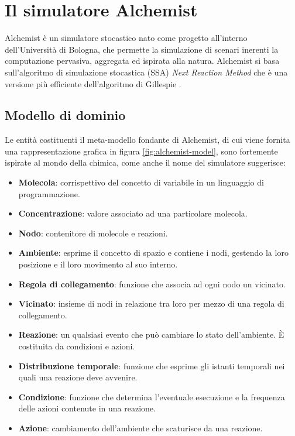 \section{Il simulatore Alchemist}
Alchemist \cite{Pianini2013} è un simulatore stocastico nato come progetto all'interno dell'Università di Bologna, che permette la simulazione di scenari inerenti la computazione pervasiva, aggregata ed ispirata alla natura.
\newline
Alchemist si basa sull'algoritmo di simulazione stocastica (SSA) \textit{Next Reaction Method} \cite{Gibson2000} che è una versione più efficiente dell'algoritmo di Gillespie \cite{Gillespie1977}.

\subsection{Modello di dominio}
Le entità costituenti il meta-modello fondante di Alchemist, di cui viene fornita una rappresentazione grafica in figura \ref{fig:alchemist-model}, sono fortemente ispirate al mondo della chimica, come anche il nome del simulatore suggerisce:
\begin{itemize}
 \item \textbf{Molecola}: corrispettivo del concetto di variabile in un linguaggio di programmazione.
 \item \textbf{Concentrazione}: valore associato ad una particolare molecola.
 \item \textbf{Nodo}: contenitore di molecole e reazioni.
 \item \textbf{Ambiente}: esprime il concetto di spazio e contiene i nodi, gestendo la loro posizione e il loro movimento al suo interno.
 \item \textbf{Regola di collegamento}: funzione che associa ad ogni nodo un vicinato.
 \item \textbf{Vicinato}: insieme di nodi in relazione tra loro per mezzo di una regola di collegamento.
 \item \textbf{Reazione}: un qualsiasi evento che può cambiare lo stato dell'ambiente. È costituita da condizioni e azioni.
 \item \textbf{Distribuzione temporale}: funzione che esprime gli istanti temporali nei quali una reazione deve avvenire.
 \item \textbf{Condizione}: funzione che determina l'eventuale esecuzione e la frequenza delle azioni contenute in una reazione.
 \item \textbf{Azione}: cambiamento dell'ambiente che scaturisce da una reazione.
\end{itemize}
